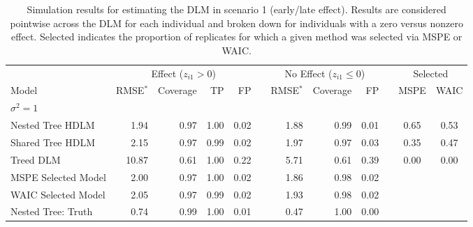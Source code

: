\documentclass[12pt]{article}
\begin{document}
\begin{table}[!ht]
\scriptsize
    \centering
    \caption{Simulation results for estimating the DLM in scenario 1 (early/late effect). Results are considered pointwise across the DLM for each individual and broken down for individuals with a zero versus nonzero effect. Selected indicates the proportion of replicates for which a given method was selected via MSPE or WAIC.}\vspace{6pt}
    \label{tab:scen1_res}
    \begin{tabular}{lrrrrrrrrrcc}
        \toprule[2pt]
        &\multicolumn{4}{c}{Effect ($z_{i1}>0$)}&&\multicolumn{3}{c}{No Effect ($z_{i1}\leq0$)}&&\multicolumn{2}{c}{Selected}\\
        \cmidrule(lr){2-5} \cmidrule(lr){7-9} \cmidrule(lr){11-12}
        Model & RMSE$^*$ & Coverage & TP & FP & \phantom{} &RMSE$^*$ & Coverage & FP && MSPE & WAIC\\
        \midrule
        \multicolumn{9}{l}{$\sigma^2=1$}\\
      Nested Tree HDLM & 1.94 & 0.97 & 1.00 & 0.02 &  & 1.88 & 0.99 & 0.01 &  & 0.65 & 0.53\\
      Shared Tree HDLM & 2.15 & 0.97 & 0.99 & 0.02 &  & 1.97 & 0.97 & 0.03 &  & 0.35 & 0.47\\
            Treed DLM & 10.87 & 0.61 & 1.00 & 0.22 &  & 5.71 & 0.61 & 0.39 &  & 0.00 & 0.00\\
\addlinespace
MSPE Selected Model & 2.00 & 0.97 & 1.00 & 0.02 &  & 1.86 & 0.98 & 0.02 &  \\
WAIC Selected Model & 2.05 & 0.97 & 0.99 & 0.02 &  & 1.93 & 0.98 & 0.02 &  \\
\addlinespace
   Nested Tree: Truth & 0.74 & 0.99 & 1.00 & 0.01 &  & 0.47 & 1.00 & 0.00 &  \\


\midrule
        

\end{tabular}
\end{table}
\end{document}
